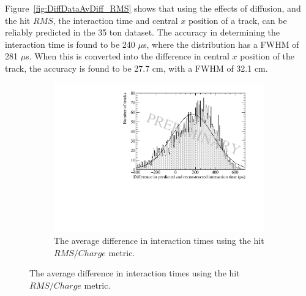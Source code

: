 Figure~\ref{fig:DiffDataAvDiff_RMS} shows that using the effects of diffusion, and the hit $RMS$, the interaction time and central $x$ position of a track, can be reliably predicted in the 35 ton dataset. The accuracy in determining the interaction time is found to be 240 $\mu$s, where the distribution has a FWHM of 281 $\mu$s. When this is converted into the difference in central $x$ position of the track, the accuracy is found to be 27.7 cm, with a FWHM of 32.1 cm. \\

\begin{figure}
  \centering
  \begin{subfigure}{0.6\textwidth}
    \centering
    \includegraphics[width=\textwidth]{Data_AvTimeDiff_RMS_Int}
    \caption{The average difference in interaction times using the hit $RMS/Charge$ metric.}
    \label{fig:DiffDataAvDiff_RMS_Int_T}
  \end{subfigure}


\end{figure}
